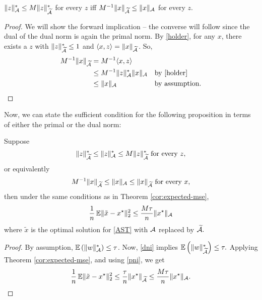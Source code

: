 \begin{lemma}
${\lVert z\rVert_{\mathcal{A}}^* \leq M\lVert z\rVert_{\widetilde{\mathcal{A}}}^*}$ for every $z$ iff
${M^{-1}\lVert x\rVert_{\widetilde{\mathcal{A}}} \leq \lVert x\rVert_{\mathcal{A}}}$ for every $z$.
\end{lemma}
\begin{proof}\belowdisplayskip=-12pt
We will show the forward implication -- the converse will follow since the dual
of the dual norm is again the primal norm. By \eqref{holder}, for any $x$, 
there exists a $z$ with
$\lVert z\rVert_{\widetilde{\mathcal{A}}}^* \leq 1$ and ${\langle x, z\rangle =
\lVert x\rVert_{\widetilde{\mathcal{A}}}}$. So,
\begin{align*}
M^{-1}\lVert x\rVert_{\widetilde{\mathcal{A}}} &= M^{-1}\langle x, z\rangle &&\\
&\leq M^{-1}\lVert z\rVert_{\mathcal{A}}^* \lVert x\rVert_{\mathcal{A}} &&\text{by \eqref{holder}}\\
&\leq \lVert x\rVert_{\mathcal{A}} &&\text{by assumption.}
\end{align*}
\end{proof}
Now, we can state the sufficient condition for the following proposition in
terms of either the primal or the dual norm:
\begin{prop}\label{prop:grid-approx-mse}
Suppose 
\begin{equation}
  \label{dni}
  \lVert z\rVert_{\widetilde{\mathcal{A}}}^* \leq \lVert z\rVert_{\mathcal{A}}^* \leq 
  M\lVert z\rVert_{\widetilde{\mathcal{A}}}^* \text{ for every } z,
\end{equation}
or equivalently 
\begin{equation}
  \label{pni}
  M^{-1}\lVert x\rVert_{\widetilde{\mathcal{A}}} \leq \lVert x\rVert_{\mathcal{A}} \leq \lVert x\rVert_{\widetilde{\mathcal{A}}} \text{ for every } x,
\end{equation}
then under the same conditions as in Theorem \ref{cor:expected-mse},
\begin{equation*}
    \frac{1}{n} \operatorname{\mathbb{E}} \lVert\tilde{x} - x^\star\rVert_2^2 \leq \frac{M \tau}{n}\lVert x^\star\rVert_{\mathcal{A}}
\end{equation*}
where $\tilde{x}$ is the optimal solution for \eqref{AST} with $\mathcal{A}$ replaced by $\widetilde{\mathcal{A}}.$
\end{prop}
\begin{proof}\belowdisplayskip=-12pt
By assumption, $\operatorname{\mathbb{E}}\left(\lVert w\rVert_{\mathcal{A}}^*\right) \leq \tau$. Now, \eqref{dni}
implies $\operatorname{\mathbb{E}}\left(\lVert w\rVert_{\widetilde{\mathcal{A}}}^*\right) \leq \tau.$ Applying
Theorem \ref{cor:expected-mse}, and using \eqref{pni}, we get
\begin{equation*}
\frac{1}{n} \operatorname{\mathbb{E}} \lVert\tilde{x} - x^\star\rVert_2^2 \leq \frac{\tau}{n}\lVert x^\star\rVert_{\widetilde{\mathcal{A}}} \leq \frac{M \tau}{n}\lVert x^\star\rVert_{\mathcal{A}}.
\end{equation*}
\end{proof}

